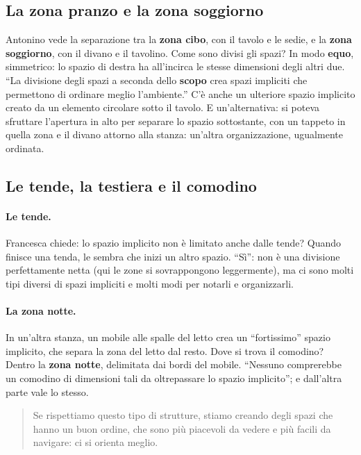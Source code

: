 \subsection{La zona pranzo e la zona soggiorno}

Antonino vede la separazione tra la \textbf{zona cibo}, con il tavolo e le sedie, e la
\textbf{zona soggiorno}, con il divano e il tavolino. Come sono divisi gli spazi? In modo
\textbf{equo}, simmetrico: lo spazio di destra ha all'incirca le stesse dimensioni degli
altri due. ``La divisione degli spazi a seconda dello \textbf{scopo} crea spazi impliciti
che permettono di ordinare meglio l'ambiente.'' C'è anche un ulteriore spazio implicito
creato da un elemento circolare sotto il tavolo. E un'alternativa: si poteva sfruttare
l'apertura in alto per separare lo spazio sottostante, con un tappeto in quella zona e il
divano attorno alla stanza: un'altra organizzazione, ugualmente ordinata.

\subsection{Le tende, la testiera e il comodino}

\paragraph{Le tende.} Francesca chiede: lo spazio implicito non è limitato anche dalle
tende? Quando finisce una tenda, le sembra che inizi un altro spazio. ``Sì'': non è una
divisione perfettamente netta (qui le zone si sovrappongono leggermente), ma ci sono molti
tipi diversi di spazi impliciti e molti modi per notarli e organizzarli.

\paragraph{La zona notte.} In un'altra stanza, un mobile alle spalle del letto crea un
``fortissimo'' spazio implicito, che separa la zona del letto dal resto. Dove si trova il
comodino? Dentro la \textbf{zona notte}, delimitata dai bordi del mobile. ``Nessuno
comprerebbe un comodino di dimensioni tali da oltrepassare lo spazio implicito''; e
dall'altra parte vale lo stesso.
\begin{quote}
Se rispettiamo questo tipo di strutture, stiamo creando degli spazi che hanno un buon
ordine, che sono più piacevoli da vedere e più facili da navigare: ci si orienta meglio.
\end{quote}

